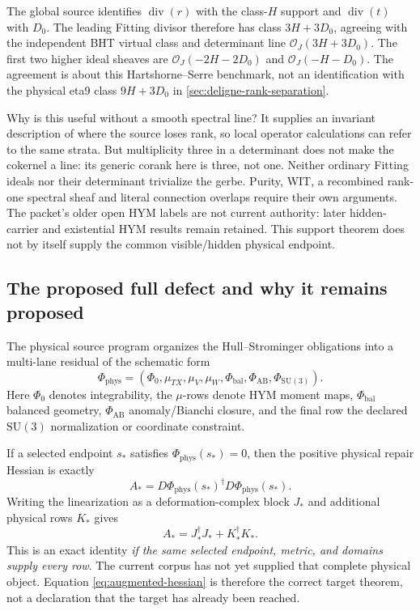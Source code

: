 \documentclass[11pt,a4paper]{article}
\begin{document}
The global source identifies \(\operatorname{div}(r)\) with the
class-\(H\) support and \(\operatorname{div}(t)\) with \(D_0\). The leading
Fitting divisor therefore has class \(3H+3D_0\), agreeing with the
independent BHT virtual class and determinant line
\(\mathcal O_J(3H+3D_0)\). The first two higher ideal sheaves are
\(\mathcal O_J(-2H-2D_0)\) and \(\mathcal O_J(-H-D_0)\).
The agreement is about this Hartshorne--Serre benchmark, not an
identification with the physical eta9 class \(9H+3D_0\) in
\cref{sec:deligne-rank-separation}.

Why is this useful without a smooth spectral line? It supplies an invariant
description of where the source loses rank, so local operator calculations
can refer to the same strata. But multiplicity three in a determinant does
not make the cokernel a line: its generic corank here is three, not one.
Neither ordinary Fitting ideals nor their determinant trivialize the gerbe.
Purity, WIT, a recombined rank-one spectral sheaf and literal connection
overlaps require their own arguments. The packet's older open HYM labels
are not current authority: later hidden-carrier and existential HYM results
remain retained. This support theorem does not by itself supply the common
visible/hidden physical endpoint.

\subsection{The proposed full defect and why it remains proposed}

The physical source program organizes the Hull--Strominger obligations into
a multi-lane residual of the schematic form
\begin{equation}
\Phi_{\mathrm{phys}}=
(\Phi_0,\mu_{TX},\mu_V,\mu_W,
\Phi_{\mathrm{bal}},\Phi_{\mathrm{AB}},\Phi_{\mathrm{SU(3)}}).
\label{eq:seven-lane}
\end{equation}
Here \(\Phi_0\) denotes integrability, the \(\mu\)-rows denote HYM moment
maps, \(\Phi_{\mathrm{bal}}\) balanced geometry,
\(\Phi_{\mathrm{AB}}\) anomaly/Bianchi closure, and the final row the
declared \(\mathrm{SU}(3)\) normalization or coordinate constraint.

If a selected endpoint \(s_*\) satisfies
\(\Phi_{\mathrm{phys}}(s_*)=0\), then the positive physical repair Hessian is
exactly
\begin{equation}
A_*=D\Phi_{\mathrm{phys}}(s_*)^{\dagger}
D\Phi_{\mathrm{phys}}(s_*).
\label{eq:physical-candidate}
\end{equation}
Writing the linearization as a deformation-complex block \(J_*\) and
additional physical rows \(K_*\) gives
\begin{equation}
A_*=J_*^{\dagger}J_*+K_*^{\dagger}K_*.
\label{eq:augmented-hessian}
\end{equation}
This is an exact identity \emph{if the same selected endpoint, metric, and
domains supply every row}.  The current corpus has not yet supplied that
complete physical object.  Equation \eqref{eq:augmented-hessian} is therefore
the correct target theorem, not a declaration that the target has already
been reached.
\end{document}

